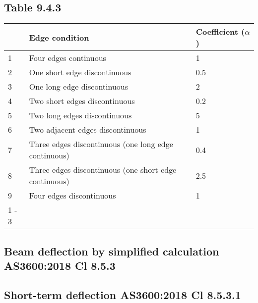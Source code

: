 \documentclass{article}%
\begin{document}
\subsection*{Table 9.4.3}%
\label{subsec:Table9.4.3}%
\begin{tabular}{l l | l }%
\hline%
&Edge condition&Coefficient ($\alpha$)\\%
\hline%
1&Four edges continuous&1\\%
2&One short edge discontinuous&0.5\\%
3&One long edge discontinuous&2\\%
4&Two short edges discontinuous&0.2\\%
5&Two long edges discontinuous&5\\%
6&Two adjacent edges discontinuous&1\\%
7&Three edges discontinuous (one long edge continuous)&0.4\\%
8&Three edges discontinuous (one short edge continuous)&2.5\\%
9&Four edges discontinuous&1\\%
\cline{1%
-%
3}%
\end{tabular}

%
\subsection*{Beam deflection by simplified calculation AS3600:2018 Cl 8.5.3}%
\label{subsec:BeamdeflectionbysimplifiedcalculationAS36002018Cl8.5.3}%

%
\subsection*{Short{-}term deflection AS3600:2018 Cl 8.5.3.1}%
\label{subsec:Short{-}termdeflectionAS36002018Cl8.5.3.1}%
\end{document}
